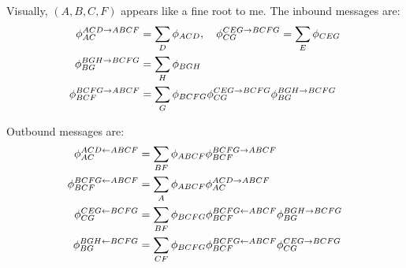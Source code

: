 
Visually, $(A,B,C,F)$ appears like a fine root to me. The inbound messages are:
\begin{align*}
    \phi^{ACD\to ABCF}_{AC} &= \sum_D \phi_{ACD},~~~
    \phi^{CEG\to BCFG}_{CG} = \sum_E \phi_{CEG}\\
    \phi^{BGH\to BCFG}_{BG} &= \sum_H \phi_{BGH}\\
    \phi^{BCFG\to ABCF}_{BCF} &= \sum_G \phi_{BCFG} \phi^{CEG\to BCFG}_{CG} \phi^{BGH\to BCFG}_{BG} 
\end{align*}

Outbound messages are:
\begin{align*}
    \outbound{ACD}{ABCF}{AC} &= \sum_{BF} \clique{ABCF} \inbound{BCFG}{ABCF}{BCF} \\%
    \outbound{BCFG}{ABCF}{BCF} &= \sum_{A} \clique{ABCF}\inbound{ACD}{ABCF}{AC} \\%
    \outbound{CEG}{BCFG}{CG} &= \sum_{BF} \clique{BCFG} \outbound{BCFG}{ABCF}{BCF} \inbound{BGH}{BCFG}{BG}\\
    \outbound{BGH}{BCFG}{BG} &= \sum_{CF} \clique{BCFG} \outbound{BCFG}{ABCF}{BCF} \inbound{CEG}{BCFG}{CG}
\end{align*}